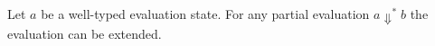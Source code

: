 \documentclass[acmsmall,review,screen]{acmart}
\begin{document}
  
  
\begin{theorem}[Progress]
Let $a$ be a well-typed evaluation state. For any partial evaluation $a \Downarrow^* b$ 
the evaluation can be extended.
\end{theorem}


%
%
%
%
%




\end{document}
